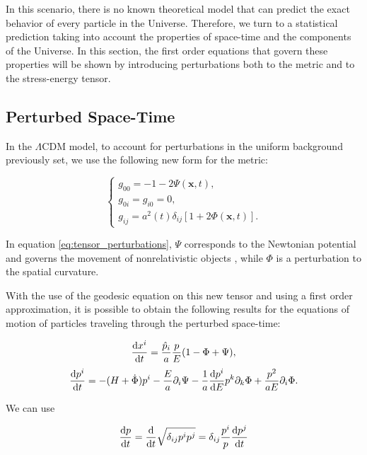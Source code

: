 \documentclass[openany,a4paper,12pt,oneside]{book}
\begin{document}
\begin{spacing}{1.5}
In this scenario, there is no known theoretical model that can predict the exact behavior of every particle in the Universe. Therefore, we turn to a statistical prediction taking into account the properties of space-time and the components of the Universe. In this section, the first order equations that govern these properties will be shown by introducing perturbations both to the metric and to the stress-energy tensor. 

\subsection{Perturbed Space-Time}

In the $\Lambda$CDM model, to account for perturbations in the uniform background previously set, we use the following new form for the metric:

\begin{equation}\label{eq:tensor_perturbations}
\begin{cases}
    g_{00}=-1-2\Psi(\mathbf{x},t),\\
    g_{0i}=g_{i0}=0,\\
    g_{ij}=a^2(t)\delta_{ij}[1+2\Phi(\mathbf{x}, t)].
\end{cases}
\end{equation}

In equation \eqref{eq:tensor_perturbations}, $\Psi$ corresponds to the Newtonian potential and governs the movement of nonrelativistic objects \cite{dodelson2020modern}, while $\Phi$ is a perturbation to the spatial curvature.

With the use of the geodesic equation on this new tensor and using a first order approximation, it is possible to obtain the following results for the equations of motion of particles traveling through the perturbed space-time:

\begin{equation}\label{ch2:dxidt}
    \dv{x^i}{t}=\frac{\hat{p}_i}{a}\frac{p}{E}(1-\Phi+\Psi),
\end{equation}
\begin{equation}\label{ch2:dpidt}
    \dv{p^i}{t}=-(H+\dot{\Phi})p^i-\frac{E}{a}\partial_i\Psi-\frac{1}{a}\dv{p^i}{E}p^k\partial_k\Phi+\frac{p^2}{aE}\partial_i\Phi.
\end{equation}

We can use

\begin{equation}
    \dv{p}{t}=\dv{}{t}\sqrt{\delta_{ij}p^i p^j}=\delta_{ij}\frac{p^i}{p}\dv{p^j}{t}
\end{equation}


\end{spacing}
\end{document}
